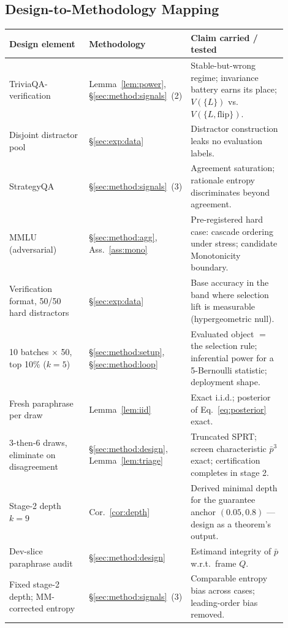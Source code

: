 \documentclass[11pt]{article}
\newcommand{\pbar}{\bar{p}}
\begin{document}
\subsection{Design-to-Methodology Mapping}
\label{sec:exp:mapping}

\begin{table}[t]
\centering
\small
\begin{tabular}{@{}p{0.30\linewidth} p{0.24\linewidth} p{0.36\linewidth}@{}}
\toprule
\textbf{Design element} & \textbf{Methodology} & \textbf{Claim carried / tested} \\
\midrule
TriviaQA-verification & Lemma~\ref{lem:power}, \S\ref{sec:method:signals}~(2) &
Stable-but-wrong regime; invariance battery earns its place; $V(\{L\})$ vs.\ $V(\{L,\mathrm{flip}\})$. \\
Disjoint distractor pool & \S\ref{sec:exp:data} &
Distractor construction leaks no evaluation labels. \\
StrategyQA & \S\ref{sec:method:signals}~(3) &
Agreement saturation; rationale entropy discriminates beyond agreement. \\
MMLU (adversarial) & \S\ref{sec:method:agg}, Ass.~\ref{ass:mono} &
Pre-registered hard case: cascade ordering under stress; candidate Monotonicity boundary. \\
Verification format, 50/50 hard distractors & \S\ref{sec:exp:data} &
Base accuracy in the band where selection lift is measurable (hypergeometric null). \\
10 batches $\times$ 50, top 10\% ($k = 5$) & \S\ref{sec:method:setup}, \S\ref{sec:method:loop} &
Evaluated object $=$ the selection rule; inferential power for a 5-Bernoulli statistic; deployment shape. \\
Fresh paraphrase per draw & Lemma~\ref{lem:iid} &
Exact i.i.d.; posterior of Eq.~\eqref{eq:posterior} exact. \\
3-then-6 draws, eliminate on disagreement & \S\ref{sec:method:design}, Lemma~\ref{lem:triage} &
Truncated SPRT; screen characteristic $\pbar^3$ exact; certification completes in stage 2. \\
Stage-2 depth $k=9$ & Cor.~\ref{cor:depth} &
Derived minimal depth for the guarantee anchor $(0.05, 0.8)$ --- design as a theorem's output. \\
Dev-slice paraphrase audit & \S\ref{sec:method:design} &
Estimand integrity of $\pbar$ w.r.t.\ frame $Q$. \\
Fixed stage-2 depth; MM-corrected entropy & \S\ref{sec:method:signals}~(3) &
Comparable entropy bias across cases; leading-order bias removed. \\

\end{tabular}
\end{table}
\end{document}
